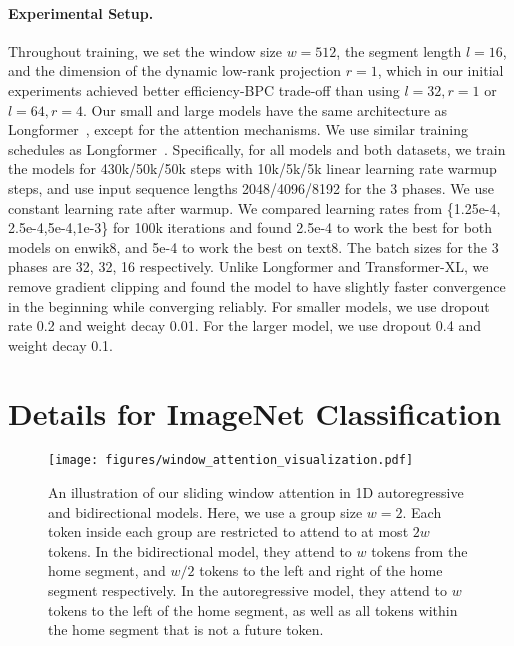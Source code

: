 \paragraph{Experimental Setup.}
Throughout training, we set the window size $w=512$, the segment length $l=16$, and the dimension of the dynamic low-rank projection $r=1$, which in our initial experiments achieved better efficiency-BPC trade-off than using $l=32,r=1$ or $l=64,r=4$. Our small and large models have the same architecture as Longformer~\cite{beltagy2020longformer}, except for the attention mechanisms. We use similar training schedules as Longformer~\cite{beltagy2020longformer}. Specifically, for all models and both datasets, we train the models for 430k/50k/50k steps with 10k/5k/5k linear learning rate warmup steps, and use input sequence lengths 2048/4096/8192 for the 3 phases. We use constant learning rate after warmup. We compared learning rates from \{1.25e-4, 2.5e-4,5e-4,1e-3\} for 100k iterations and found 2.5e-4 to work the best for both models on enwik8, and 5e-4 to work the best on text8. The batch sizes for the 3 phases are 32, 32, 16 respectively. Unlike Longformer and Transformer-XL, we remove gradient clipping and found the model to have slightly faster convergence in the beginning while converging reliably. For smaller models, we use dropout rate 0.2 and weight decay 0.01. For the larger model, we use dropout 0.4 and weight decay 0.1. 



\section{Details for ImageNet Classification}
\label{appendix:image_params}

\begin{figure}
\begin{center}
    \texttt{[image: figures/window\_attention\_visualization.pdf]}
\end{center}
\caption{An illustration of our sliding window attention in 1D autoregressive and bidirectional models. Here, we use a group size $w=2$. Each token inside each group are restricted to attend to at most $2w$ tokens. In the bidirectional model, they attend to $w$ tokens from the home segment, and $w/2$ tokens to the left and right of the home segment respectively. In the autoregressive model, they attend to $w$ tokens to the left of the home segment, as well as all tokens within the home segment that is not a future token.}
\label{fig:window_attention}
\end{figure}

